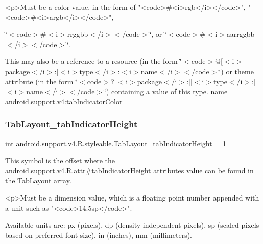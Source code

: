 \begin{DoxyVerb}      <p>Must be a color value, in the form of "<code>#<i>rgb</i></code>", "<code>#<i>argb</i></code>",
\end{DoxyVerb}
 \char`\"{}$<$code$>$\#$<$i$>$rrggbb$<$/i$>$$<$/code$>$\char`\"{}, or \char`\"{}$<$code$>$\#$<$i$>$aarrggbb$<$/i$>$$<$/code$>$\char`\"{}. 

This may also be a reference to a resource (in the form \char`\"{}$<$code$>$@\mbox{[}$<$i$>$package$<$/i$>$\+:\mbox{]}$<$i$>$type$<$/i$>$\+:$<$i$>$name$<$/i$>$$<$/code$>$\char`\"{}) or theme attribute (in the form \char`\"{}$<$code$>$?\mbox{[}$<$i$>$package$<$/i$>$\+:\mbox{]}\mbox{[}$<$i$>$type$<$/i$>$\+:\mbox{]}$<$i$>$name$<$/i$>$$<$/code$>$\char`\"{}) containing a value of this type.  name android.\+support.\+v4\+:tab\+Indicator\+Color \mbox{\label{classandroid_1_1support_1_1v4_1_1R_1_1styleable_a11f9245f1247673750bf79b31c3e1832}} 
\subsubsection{\texorpdfstring{Tab\+Layout\+\_\+tab\+Indicator\+Height}{TabLayout\_tabIndicatorHeight}}
{\footnotesize\ttfamily int android.\+support.\+v4.\+R.\+styleable.\+Tab\+Layout\+\_\+tab\+Indicator\+Height = 1\hspace{0.3cm}{\ttfamily [static]}}

This symbol is the offset where the \hyperlink{classandroid_1_1support_1_1v4_1_1R_1_1attr_a74c5fb6adf86e709c57704f21e358c75}{android.\+support.\+v4.\+R.\+attr\#tab\+Indicator\+Height} attribute\textquotesingle{}s value can be found in the \hyperlink{classandroid_1_1support_1_1v4_1_1R_1_1styleable_a48e866d7121b40ef0bb3d467759606a9}{Tab\+Layout} array.

\begin{DoxyVerb}      <p>Must be a dimension value, which is a floating point number appended with a unit such as "<code>14.5sp</code>".
\end{DoxyVerb}
 Available units are\+: px (pixels), dp (density-\/independent pixels), sp (scaled pixels based on preferred font size), in (inches), mm (millimeters). 


